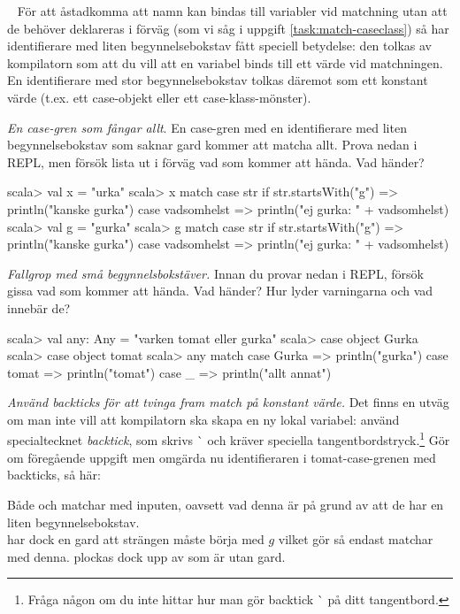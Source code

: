 \QUESTBEGIN

\Task  \what~  För att åstadkomma att namn kan bindas till variabler vid matchning utan att de behöver deklareras i förväg (som vi såg i uppgift \ref{task:match-caseclass}) så har identifierare med liten begynnelsebokstav fått speciell betydelse: den tolkas av kompilatorn som att du vill att en variabel  binds till ett värde vid matchningen. En identifierare med stor begynnelsebokstav tolkas däremot som ett konstant värde (t.ex. ett case-objekt eller ett case-klass-mönster).

\Subtask \emph{En case-gren som fångar allt}. En case-gren med en identifierare med liten begynnelsebokstav som saknar gard kommer att matcha allt. Prova nedan i REPL, men försök lista ut i förväg vad som kommer att hända. Vad händer?
\begin{REPL}
scala> val x = "urka"
scala> x match
         case str if str.startsWith("g") => println("kanske gurka")
         case vadsomhelst => println("ej gurka: " + vadsomhelst)
scala> val g = "gurka"
scala> g match
         case str if str.startsWith("g") => println("kanske gurka")
         case vadsomhelst => println("ej gurka: " + vadsomhelst)
\end{REPL}

\Subtask \emph{Fallgrop med små begynnelsbokstäver.} Innan du provar nedan i REPL, försök gissa vad som kommer att hända. Vad händer? Hur lyder varningarna och vad innebär de?
\begin{REPL}
scala> val any: Any = "varken tomat eller gurka"
scala> case object Gurka
scala> case object tomat
scala> any match
         case Gurka => println("gurka")
         case tomat => println("tomat")
         case _ => println("allt annat")
\end{REPL}

\Subtask \emph{Använd backticks för att tvinga fram match på konstant värde.} Det finns en utväg om man inte vill att kompilatorn ska skapa en ny lokal variabel: använd specialtecknet \emph{backtick}, som skrivs \`{} och kräver speciella tangentbordstryck.\footnote{Fråga någon om du inte hittar hur man gör backtick \`{} på ditt tangentbord.}  Gör om föregående uppgift men omgärda nu identifieraren  i tomat-case-grenen med backticks, så här: 



\SOLUTION


\TaskSolved \what


\SubtaskSolved  Både  och  matchar med inputen, oavsett vad denna är på grund av att de har en liten begynnelsebokstav.\\
  har dock en gard att strängen måste börja med $g$ vilket gör så endast  matchar med denna.  plockas dock upp av  som är utan gard.

